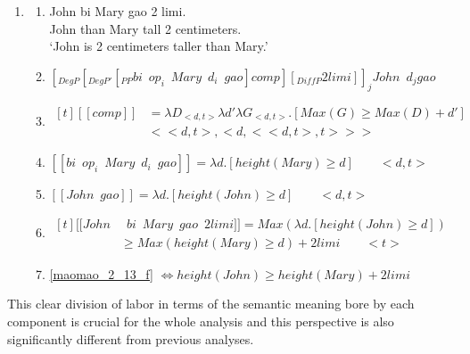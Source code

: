 \documentclass{ctexart}
\begin{document}
\begin{enumerate}
    \item \label{maomao_2_13}
    \begin{enumerate}
        \item \label{maomao_2_13_a}
        John bi Mary gao 2 limi. \\
        John than Mary tall 2 centimeters. \\
        `John is 2 centimeters taller than Mary.'

        \item \label{maomao_2_13_b}
        $[_{DegP}[_{DegP'}[_{PP}bi \enspace op_i \enspace Mary \enspace d_i \enspace gao] comp][_{DiffP}2limi]]_j John \enspace d_j gao$

        \item \label{maomao_2_13_c}
        $\begin{aligned}[t]
            [\![comp]\!]&=\lambda D_{<d,t>} \lambda d' \lambda G_{<d,t>} . [Max(G) \geq Max(D) + d'] \\ & <<d,t>,<d,<<d,t>,t>>>
        \end{aligned}$

        \item \label{maomao_2_13_d}
        $[\![bi \enspace op_i \enspace Mary \enspace d_i \enspace gao]\!]
        = \lambda d.[height(Mary) \geq d] \qquad <d,t>$

        \item \label{maomao_2_13_e}
        $[\![John \enspace gao]\!] = \lambda d.[height(John) \geq d] \qquad <d,t>$

        \item \label{maomao_2_13_f}
        $\begin{aligned}[t]
            [\![John &\enspace bi \enspace Mary \enspace gao \enspace 2 limi]\!] 
            = Max(\lambda d.[height(John) \geq d]) \\ &\geq Max(height(Mary) \geq d) + 2limi \qquad <t>
        \end{aligned}$

        \item \label{maomao_2_13_g}
        \ref{maomao_2_13_f} $\Leftrightarrow height(John) \geq height(Mary) + 2limi$

    \end{enumerate}
\end{enumerate}

This clear division of labor in terms of the semantic meaning bore by each component is crucial for the whole analysis and this perspective is also significantly different from previous analyses.
\end{document}
